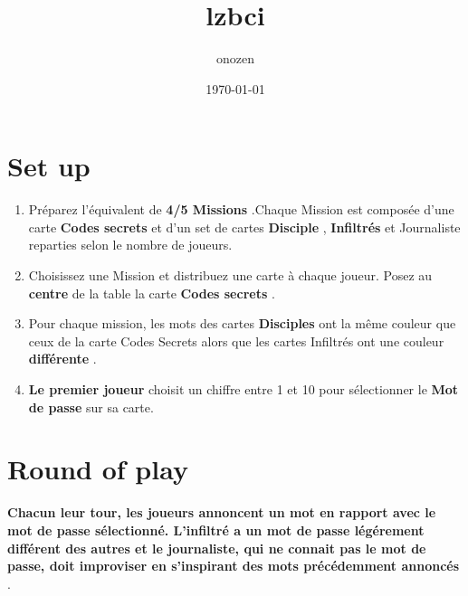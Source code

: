 \documentclass{article}%
\title{lzbci}%
\author{onozen}%
\date{\today}%
\begin{document}
%
\pagestyle{empty}%
\normalsize%
\maketitle%
\section{ Set up
}%
\label{sec:Setup}%
\begin{enumerate}%
\item%
%
 Préparez l'équivalent de %
\textbf{4/5 Missions}%
.Chaque Mission est composée d'une carte %
\textbf{Codes secrets}%
 et d'un set de cartes %
\textbf{Disciple}%
,%
\textbf{ Infiltrés}%
 et Journaliste reparties selon le nombre de joueurs.
%
\item%
%
 Choisissez une Mission et distribuez une carte à chaque joueur. Posez au %
\textbf{centre}%
 de la table la carte %
\textbf{Codes secrets}%
.
%
\item%
%
 Pour chaque mission, les mots des cartes %
\textbf{Disciples}%
 ont la même couleur que ceux de la carte Codes Secrets alors que les cartes Infiltrés ont une couleur %
\textbf{différente}%
.
%
\item%
%
\textbf{Le premier joueur}%
 choisit un chiffre entre 1 et 10 pour sélectionner le %
\textbf{Mot de passe}%
 sur sa carte.
%
\end{enumerate}

%
\section{ Round of play
}%
\label{sec:Roundofplay}%
\textbf{Chacun leur tour, les joueurs annoncent un mot en rapport avec le mot de passe sélectionné. L'infiltré a un mot de passe légérement différent des autres et le journaliste, qui ne connait pas le mot de passe, doit improviser en s'inspirant des mots précédemment annoncés}%
.


%
\end{document}
